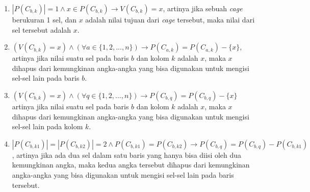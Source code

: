 \begin{enumerate}
\item \begin{math}|P(C_{b,k})| = 1 \land x \in P(C_{b,k}) \rightarrow V(C_{b,k}) = x\end{math}, artinya jika sebuah \textit{cage} berukuran 1 sel, dan \begin{math}x\end{math} adalah nilai tujuan dari \textit{cage} tersebut, maka nilai dari sel tersebut adalah \begin{math}x\end{math}.
\item \begin{math}(V(C_{b,k}) = x) \land (\forall a \in \{1, 2, ..., n\}) \rightarrow P(C_{a,k}) = P(C_{a,k}) - \{x\}\end{math}, artinya jika nilai suatu sel pada baris \begin{math}b\end{math} dan kolom \begin{math}k\end{math} adalah \begin{math}x\end{math}, maka \begin{math}x\end{math} dihapus dari kemungkinan angka-angka yang bisa digunakan untuk mengisi sel-sel lain pada baris \begin{math}b\end{math}.
\item \begin{math}(V(C_{b,k}) = x) \land (\forall q \in \{1, 2, ..., n\}) \rightarrow P(C_{b,q}) = P(C_{b,q}) - \{x\}\end{math} artinya jika nilai suatu sel pada baris \begin{math}b\end{math} dan kolom \begin{math}k\end{math} adalah \begin{math}x\end{math}, maka \begin{math}x\end{math} dihapus dari kemungkinan angka-angka yang bisa digunakan untuk mengisi sel-sel lain pada kolom \begin{math}k\end{math}.
\item \begin{math}|P(C_{b,k1})| = |P(C_{b,k2})| = 2 \land P(C_{b,k1}) = P(C_{b,k2}) \rightarrow P(C_{b,q}) = P(C_{b,q}) - P(C_{b,k1})\end{math}, artinya jika ada dua sel dalam satu baris yang hanya bisa diisi oleh dua kemungkinan angka, maka kedua angka tersebut dihapus dari kemungkinan angka-angka yang bisa digunakan untuk mengisi sel-sel lain pada baris tersebut.

\end{enumerate}
